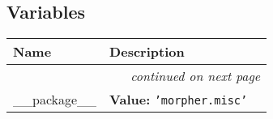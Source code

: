 
  \subsection{Variables}

    \vspace{-1cm}
\hspace{\varindent}\begin{longtable}{|p{\varnamewidth}|p{\vardescrwidth}|l}
\cline{1-2}
\cline{1-2} \centering \textbf{Name} & \centering \textbf{Description}& \\
\cline{1-2}
\endhead\cline{1-2}\multicolumn{3}{r}{\small\textit{continued on next page}}\\\endfoot\cline{1-2}
\endlastfoot\raggedright \_\-\_\-p\-a\-c\-k\-a\-g\-e\-\_\-\_\- & \raggedright \textbf{Value:} 
{\tt \texttt{'}\texttt{morpher.misc}\texttt{'}}&\\
\cline{1-2}
\end{longtable}

